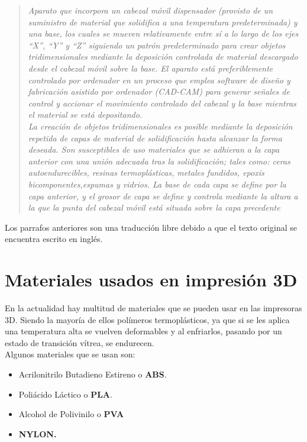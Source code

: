 \begin{quotation}
    \emph{
    Aparato que incorpora un cabezal móvil dispensador (provisto de un suministro de material que solidifica a una temperatura predeterminada) y una base, los cuales se mueven relativamente entre sí a lo largo de los ejes “X”, “Y” y “Z” siguiendo un patrón predeterminado para crear objetos tridimensionales mediante la deposición controlada de material descargado desde el cabezal móvil sobre la base. El aparato está preferiblemente controlado por ordenador en un proceso que emplea software de diseño y fabricación asistido por ordenador (CAD-CAM) para generar señales de control y accionar el movimiento controlado del cabezal y la base mientras el material se está depositando.}\\

    \emph{La creación de objetos tridimensionales es posible mediante la deposición repetida de  capas de material de solidificación hasta alcanzar la forma deseada. Son susceptibles de uso materiales que se adhieran a la capa anterior con una unión adecuada tras la solidificación; tales como: ceras autoendurecibles, resinas termoplásticas, metales fundidos, epoxis bicomponentes,espumas y vidrios. La base de cada capa se define por la capa anterior, y el grosor de capa se define y controla mediante la altura a la que la punta del cabezal móvil está situada sobre la capa precedente}

\end{quotation}

\noindent Los parrafos anteriores son una traducción libre debido a que el texto original se encuentra escrito en inglés.

\section{Materiales usados en impresión 3D}
\label{sec:materiales}

En la actualidad hay multitud de materiales que se pueden usar en las impresoras 3D. Siendo la mayoría de ellos polímeros termoplásticos, ya que si se les aplica una temperatura alta se vuelven deformables y al enfriarlos, pasando por un estado de transición vítrea, se endurecen.\\

Algunos materiales que se usan son:
\begin{itemize}
    \item Acrilonitrilo Butadieno Estireno o \textbf{ABS}.
    \item Poliácido Láctico o \textbf{PLA}.
    \item Alcohol de Polivinilo o \textbf{PVA} 
    \item \textbf{NYLON.}
\end{itemize}


